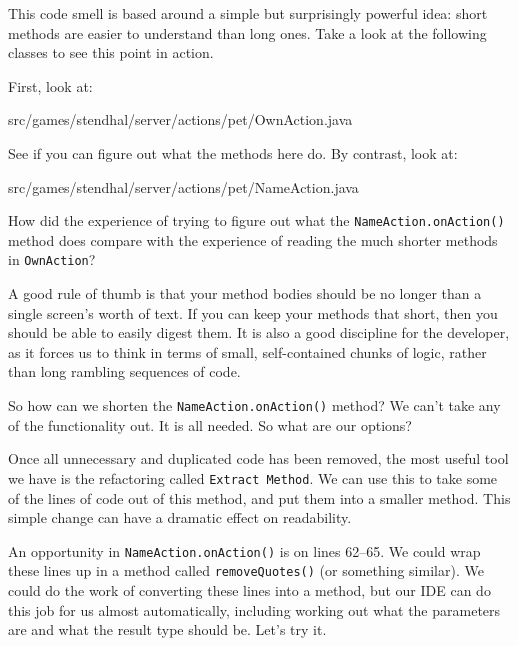 \documentclass[
]{book}
\newenvironment{Shaded}{\begin{snugshade}}{\end{snugshade}}
\newcommand{\FunctionTok}[1]{\textcolor[rgb]{0.00,0.00,0.00}{#1}}
\newcommand{\NormalTok}[1]{#1}
\begin{document}
This code smell is based around a simple but surprisingly powerful idea: short methods are easier to understand than long ones. Take a look at the following classes to see this point in action.

First, look at:

\begin{Shaded}
\begin{Highlighting}[]
\NormalTok{src/games/stendhal/server/actions/pet/OwnAction.}\FunctionTok{java}
\end{Highlighting}
\end{Shaded}

See if you can figure out what the methods here do. By contrast, look at:

\begin{Shaded}
\begin{Highlighting}[]
\NormalTok{src/games/stendhal/server/actions/pet/NameAction.}\FunctionTok{java}
\end{Highlighting}
\end{Shaded}

How did the experience of trying to figure out what the \texttt{NameAction.onAction()} method does compare with the experience of reading the much shorter methods in \texttt{OwnAction}?

A good rule of thumb is that your method bodies should be no longer than a single screen's worth of text. If you can keep your methods that short, then you should be able to easily digest them. It is also a good discipline for the developer, as it forces us to think in terms of small, self-contained chunks of logic, rather than long rambling sequences of code.

So how can we shorten the \texttt{NameAction.onAction()} method? We can't take any of the functionality out. It is all needed. So what are our options?

Once all unnecessary and duplicated code has been removed, the most useful tool we have is the refactoring called \texttt{Extract\ Method}. We can use this to take some of the lines of code out of this method, and put them into a smaller method. This simple change can have a dramatic effect on readability.

An opportunity in \texttt{NameAction.onAction()} is on lines 62--65. We could wrap these lines up in a method called \texttt{removeQuotes()} (or something similar). We could do the work of converting these lines into a method, but our IDE can do this job for us almost automatically, including working out what the parameters are and what the result type should be. Let's try it.
\end{document}
